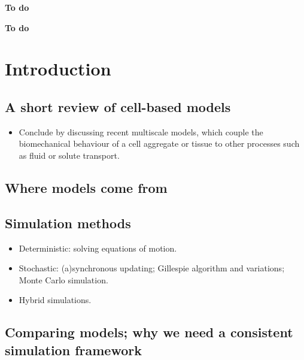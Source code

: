 \documentclass{siamltex}
\newcommand{\highlight}[1]{{\color{red} \bf{#1}}}
\begin{document}
\begin{keywords}
\highlight{To do}
\end{keywords}

\begin{AMS}
\highlight{To do}
\end{AMS}


\section{Introduction} \label{sec1}

\subsection{A short review of cell-based models}

\begin{itemize}
\item Conclude by discussing recent multiscale models, which couple the biomechanical behaviour of a cell aggregate or tissue to other processes such as fluid or solute transport.
\end{itemize}

\subsection{Where models come from}

\subsection{Simulation methods}

\begin{itemize}
\item Deterministic: solving equations of motion.
\item Stochastic: (a)synchronous updating; Gillespie algorithm and variations; Monte Carlo simulation.
\item Hybrid simulations.
\end{itemize}

\subsection{Comparing models; why we need a consistent simulation framework}
\end{document}
